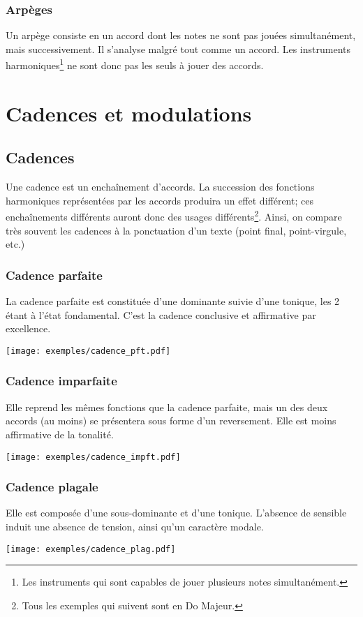 \documentclass[11pt,a4paper]{scrreprt}
\begin{document}
\subsection{Arpèges}
Un arpège consiste en un accord dont les notes ne sont pas jouées simultanément, mais successivement. Il s'analyse malgré tout comme un accord. Les instruments harmoniques\footnote{Les instruments qui sont capables de jouer plusieurs notes simultanément.} ne sont donc pas les seuls à jouer des accords.

\chapter{Cadences et modulations}
\section{Cadences}
Une cadence est un enchaînement d'accords. La succession des fonctions harmoniques représentées par les accords produira un effet différent; ces enchaînements différents auront donc des usages différents\footnote{Tous les exemples qui suivent sont en Do Majeur.}. Ainsi, on compare très souvent les cadences à la ponctuation d'un texte (point final, point-virgule, etc.)
\subsection{Cadence parfaite}
La cadence parfaite est constituée d'une dominante suivie d'une tonique, les 2 étant à l'état fondamental. C'est la cadence conclusive et affirmative par excellence.
\begin{center}
  \texttt{[image: exemples/cadence\_pft.pdf]}
\end{center}
\subsection{Cadence imparfaite}
Elle reprend les mêmes fonctions que la cadence parfaite, mais un des deux accords (au moins) se présentera sous forme d'un reversement. Elle est moins affirmative de la tonalité.
\begin{center}
   \texttt{[image: exemples/cadence\_impft.pdf]}
\end{center}
\subsection{Cadence plagale}
Elle est composée d'une sous-dominante et d'une tonique. L'absence de sensible induit une absence de tension, ainsi qu'un caractère modale.
\begin{center}
   \texttt{[image: exemples/cadence\_plag.pdf]}
\end{center}
\end{document}
